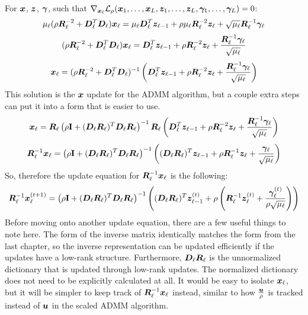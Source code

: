 For $\bm{x}$, $\bm{z}$, $\bm{\gamma}$, such that $\nabla_{\bm{x}_{\ell}} \mathcal{L}_{\rho}(\bm{x}_1,\hdots,\bm{x}_L,\bm{z}_1,\hdots,\bm{z}_L,\bm{\gamma}_1,\hdots,\bm{\gamma}_L) = 0$:
%
\begin{equation}
\mu_{\ell}(\rho \bm{R}_{\ell}^{-2} + \bm{D}_{\ell}^T\bm{D}_{\ell})\bm{x}_{\ell} = \mu_{\ell}\bm{D}_{\ell}^T\bm{z}_{\ell - 1} + \rho \mu_{\ell}\bm{R}_{\ell}^{-2}\bm{z}_{\ell} + \sqrt{\mu_{\ell}}\bm{R}_{\ell}^{-1}\bm{\gamma}_{\ell}
\end{equation}
%
\begin{equation}
(\rho \bm{R}_{\ell}^{-2} + \bm{D}_{\ell}^T\bm{D}_{\ell})\bm{x}_{\ell} = \bm{D}_{\ell}^T\bm{z}_{\ell - 1} + \rho \bm{R}_{\ell}^{-2}\bm{z}_{\ell} + \frac{\bm{R}_{\ell}^{-1}\bm{\gamma}_{\ell}}{\sqrt{\mu_{\ell}}}
\end{equation}
%
\begin{equation}
\bm{x}_{\ell} = (\rho \bm{R}_{\ell}^{-2} + \bm{D}_{\ell}^T\bm{D}_{\ell})^{-1}\left(\bm{D}_{\ell}^T\bm{z}_{\ell - 1} + \rho \bm{R}_{\ell}^{-2}\bm{z}_{\ell} + \frac{\bm{R}_{\ell}^{-1}\bm{\gamma}_{\ell}}{\sqrt{\mu_{\ell}}}\right)
\end{equation}
%
This solution is the $\bm{x}$ update for the ADMM algorithm, but a couple extra steps can put it into a form that is easier to use.
%
\begin{equation}
\bm{x}_{\ell} = \bm{R}_{\ell}\left(\rho {\bf I} + (\bm{D}_{\ell}\bm{R}_{\ell})^T\bm{D}_{\ell}\bm{R}_{\ell}\right)^{-1}\bm{R}_{\ell}\left(\bm{D}_{\ell}^T\bm{z}_{\ell - 1} + \rho \bm{R}_{\ell}^{-2}\bm{z}_{\ell} + \frac{\bm{R}_{\ell}^{-1}\bm{\gamma}_{\ell}}{\sqrt{\mu_{\ell}}}\right)
\end{equation}
%
\begin{equation}
\bm{R}_{\ell}^{-1}\bm{x}_{\ell} = \left(\rho {\bf I} + (\bm{D}_{\ell}\bm{R}_{\ell})^T\bm{D}_{\ell}\bm{R}_{\ell}\right)^{-1}\left((\bm{D}_{\ell}\bm{R}_{\ell})^T\bm{z}_{\ell - 1} + \rho \bm{R}_{\ell}^{-1}\bm{z}_{\ell} + \frac{\bm{\gamma}_{\ell}}{\sqrt{\mu_{\ell}}}\right)
\end{equation}
%
So, therefore the update equation for $\bm{R}_{\ell}^{-1}\bm{x}_{\ell}$ is the following:
%
\begin{equation}
\bm{R}_{\ell}^{-1}\bm{x}_{\ell}^{(t + 1)} = \left(\rho {\bf I} + (\bm{D}_{\ell}\bm{R}_{\ell})^T\bm{D}_{\ell}\bm{R}_{\ell}\right)^{-1}\left((\bm{D}_{\ell}\bm{R}_{\ell})^T\bm{z}_{\ell - 1}^{(t)} + \rho \left(\bm{R}_{\ell}^{-1}\bm{z}_{\ell}^{(t)} + \frac{\bm{\gamma}_{\ell}^{(t)}}{\rho\sqrt{\mu_{\ell}}}\right)\right)
\end{equation}
%
Before moving onto another update equation, there are a few useful things to note here. The form of the inverse matrix identically matches the form from the last chapter, so the inverse representation can be updated efficiently if the updates have a low-rank structure. Furthermore, $\bm{D}_{\ell}\bm{R}_{\ell}$ is the unnormalized dictionary that is updated through low-rank updates. The normalized dictionary does not need to be explicitly calculated at all. It would be easy to isolate $\bm{x}_{\ell}$, but it will be simpler to keep track of $\bm{R}_{\ell}^{-1}\bm{x}_{\ell}$ instead, similar to how $\frac{\bm{u}}{\rho}$ is tracked instead of $\bm{u}$ in the scaled ADMM algorithm.

